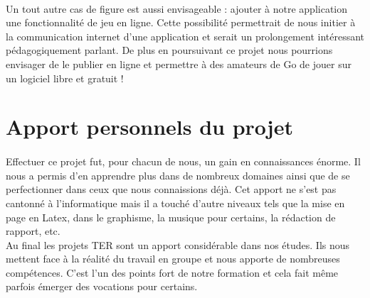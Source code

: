         \paragraph{}Un tout autre cas de figure est aussi envisageable : ajouter à notre application une fonctionnalité de jeu en ligne. Cette possibilité permettrait de nous initier à la communication internet d'une application et serait un prolongement intéressant pédagogiquement parlant. De plus en poursuivant ce projet nous pourrions envisager de le publier en ligne et permettre à des amateurs de Go de jouer sur un logiciel libre et gratuit !

    \section{Apport personnels du projet}
        \paragraph{}Effectuer ce projet fut, pour chacun de nous, un gain en connaissances énorme. Il nous a permis d'en apprendre plus dans de nombreux domaines ainsi que de se perfectionner dans ceux que nous connaissions déjà. Cet apport ne s'est pas cantonné à l'informatique mais il a touché d'autre niveaux tels que la mise en page en Latex, dans le graphisme, la musique pour certains, la rédaction de rapport, etc. \\
        Au final les projets TER sont un apport considérable dans nos études. Ils nous mettent face à la réalité du travail en groupe et nous apporte de nombreuses compétences. C'est l'un des points fort de notre formation et cela fait même parfois émerger des vocations pour certains.
